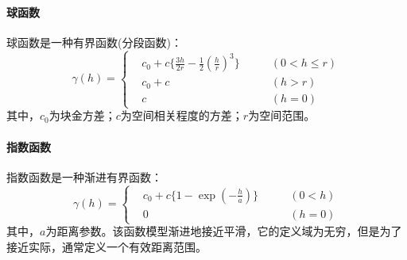 \paragraph{球函数}
球函数是一种有界函数(分段函数)：
\begin{equation}
    \gamma\left( h \right) =
    \left\{
    \begin{aligned}
         & c_{0} + c\{ \frac{3h}{2r} - \frac{1}{2} \left( \frac{h}{r} \right)^{3} \}    \qquad & \left( 0 < h \leq r \right) \\
         & c_{0} + c                                                                           & \left( h > r \right)        \\
         & c                                                                                   & \left( h = 0 \right)
    \end{aligned}
    \right.
\end{equation}
其中，$ c_{0} $为块金方差；$ c $为空间相关程度的方差；$ r $为空间范围。
\paragraph{指数函数}
指数函数是一种渐进有界函数：
\begin{equation}
    \gamma \left( h \right) =
    \left\{
    \begin{aligned}
         & c_{0} + c \{ 1 - \exp \left( - \frac{h}{a} \right) \} \qquad & \left( 0 < h \right) \\
         & 0                                                            & \left( h = 0 \right)
    \end{aligned}
    \right.
\end{equation}
其中，$ a $为距离参数。该函数模型渐进地接近平滑，它的定义域为无穷，但是为了接近实际，通常定义一个有效距离范围。

